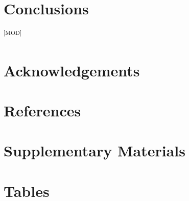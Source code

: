 \documentclass[12pt]{article}
\newcommand{\GradeModerate}{\textsuperscript{\textsf{[MOD]}}}
\begin{document}
\section{Conclusions}\label{sec:conclusions}\GradeModerate



\section*{Acknowledgements}\label{sec:acknowledgements}



\nolinenumbers

\section*{References}\label{sec:references}


\newpage
\section*{Supplementary Materials}\label{sec:supplementary}


\clearpage
\section*{Tables}\label{sec:tables}


\clearpage
\end{document}
